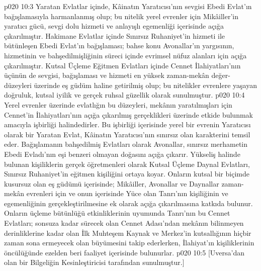 \vs p020 10:3 Yaratan Evlatlar içinde, Kâinatın Yaratıcısı’nın sevgisi Ebedi Evlat’ın bağışlamasıyla harmanlanmış olup; bu nitelik yerel evrenler için Mikâiller’in yaratıcı gücü, sevgi dolu hizmeti ve anlayışlı egemenliği içerisinde açığa çıkarılmıştır. Hakimane Evlatlar içinde Sınırsız Ruhaniyet’in hizmeti ile bütünleşen Ebedi Evlat’ın bağışlaması; bahse konu Avonallar’ın yargısının, hizmetinin ve bahşedilmişliğinin süreci içinde evrimsel nüfuz alanları için açığa çıkarılmıştır. Kutsal Üçleme Eğitmen Evlatları içinde Cennet İlahiyatları’nın üçünün de sevgisi, bağışlaması ve hizmeti en yüksek zaman\hyp{}mekân değer\hyp{}düzeyleri üzerinde eş güdüm haline getirilmiş olup; bu nitelikler evrenlere yaşayan doğruluk, kutsal iyilik ve gerçek ruhsal güzellik olarak sunulmuştur.
\vs p020 10:4 Yerel evrenler üzerinde evlatlığın bu düzeyleri, mekânın yaratılmışları için Cennet’in İlahiyatları’nın açığa çıkarılmış gerçeklikleri üzerinde etkide bulunmak amacıyla işbirliği halindedirler. Bu işbirliği içerisinde yerel bir evrenin Yaratıcısı olarak bir Yaratan Evlat, Kâinatın Yaratıcısı’nın sınırsız olan karakterini temsil eder. Bağışlamanın bahşedilmiş Evlatları olarak Avonallar, sınırsız merhametin Ebedi Evladı’nın eşi benzeri olmayan doğasını açığa çıkarır. Yükseliş halinde bulunan kişiliklerin gerçek öğretmenleri olarak Kutsal Üçleme Daynal Evlatları, Sınırsız Ruhaniyet’in eğitmen kişiliğini ortaya koyar. Onların kutsal bir biçimde kusursuz olan eş güdümü içerisinde; Mikâiller, Avonallar ve Daynallar zaman\hyp{}mekân evrenleri için ve onun içerisinde Yüce olan Tanrı’nın kişiliğinin ve egemenliğinin gerçekleştirilmesine ek olarak açığa çıkarılmasına katkıda bulunur. Onların üçleme bütünlüğü etkinliklerinin uyumunda Tanrı’nın bu Cennet Evlatları; sonsuza kadar sürecek olan Cennet Adası’ndan mekânın bilinmeyen derinliklerine kadar olan İlk Muhteşem Kaynak ve Merkez’in kutsallığının hiçbir zaman sona ermeyecek olan büyümesini takip ederlerken, İlahiyat’ın kişiliklerinin öncülüğünde ezelden beri faaliyet içerisinde bulunurlar.
\vs p020 10:5 [Uversa’dan olan bir Bilgeliğin Kesinleştiricisi tarafından sunulmuştur.]
